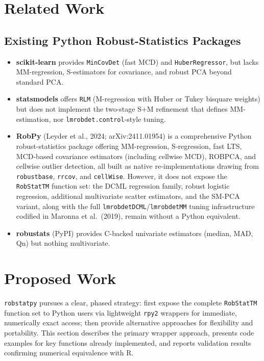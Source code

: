 \documentclass[11pt, a4paper]{article}
\begin{document}
\section{Related Work}

\subsection{Existing Python Robust-Statistics Packages}

\begin{itemize}[leftmargin=1.5em, itemsep=4pt]
  \item \textbf{scikit-learn} provides \texttt{MinCovDet} (fast MCD) and
    \texttt{HuberRegressor}, but lacks MM-regression, S-estimators for
    covariance, and robust PCA beyond standard PCA.
  \item \textbf{statsmodels} offers \texttt{RLM} (M-regression with
    Huber or Tukey bisquare weights) but does not implement the
    two-stage S+M refinement that defines MM-estimation, nor
    \texttt{lmrobdet.control}-style tuning.
  \item \textbf{RobPy} (Leyder et al., 2024; arXiv:2411.01954) is a
    comprehensive Python robust-statistics package offering MM-regression,
    S-regression, fast LTS, MCD-based covariance estimators (including
    cellwise MCD), ROBPCA, and cellwise outlier detection, all built as
    native re-implementations drawing from \texttt{robustbase},
    \texttt{rrcov}, and \texttt{cellWise}. However, it does not expose
    the \texttt{RobStatTM} function set: the DCML regression family,
    robust logistic regression, additional multivariate scatter estimators,
    and the SM-PCA variant, along with the full
    \texttt{lmrobdetDCML}/\texttt{lmrobdetMM} tuning infrastructure
    codified in Maronna et al.\ (2019), remain without a Python equivalent.
  \item \textbf{robustats} (PyPI) provides C-backed univariate
    estimators (median, MAD, Qn) but nothing multivariate.
\end{itemize}

\section{Proposed Work}

\texttt{robstatpy} pursues a clear, phased strategy: first expose the
complete \texttt{RobStatTM} function set to Python users via lightweight
\texttt{rpy2} wrappers for immediate, numerically exact access; then
provide alternative approaches for flexibility and portability.
This section describes the primary wrapper approach, presents code
examples for key functions already implemented, and reports validation
results confirming numerical equivalence with R.
\end{document}
